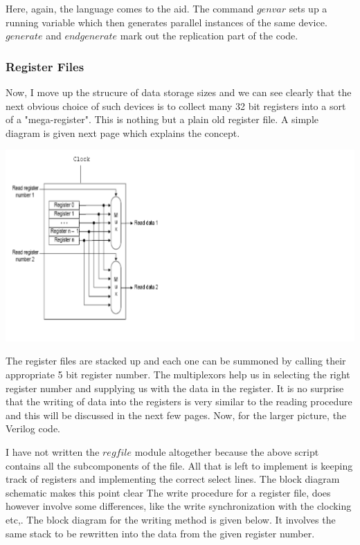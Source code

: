 \documentclass[11pt]{article}
\begin{document}
\begin{description}
Here, again, the language comes to the aid. The command $genvar$ sets up a running variable which then generates parallel instances of the same device. $generate$ and $endgenerate$ mark out the replication part of the code.
\subsubsection{Register Files}
Now, I move up the strucure of data storage sizes and we can see clearly that the next obvious choice of such devices is to collect many 32 bit registers into a sort of a "mega-register". This is nothing but a plain old register file. A simple diagram is given next page which explains the concept. 

\includegraphics[scale=0.7]{regfile.png}

The register files are stacked up and each one can be summoned by calling their appropriate 5 bit register number. The multiplexors help us in selecting the right register number and supplying us with the data in the register. It is no surprise that the writing of data into the registers is very similar to the reading procedure and this will be discussed in the next few pages. Now, for the larger picture, the Verilog code.





I have not written the $regfile$ module altogether because the above script contains all the subcomponents of the file. All that is left to implement is keeping track of registers and implementing the correct select lines. The block diagram schematic makes this point clear
The write procedure for a register file, does however involve some differences, like the write synchronization with the clocking etc,. The block diagram for the writing method is given below. It involves the same stack to be rewritten into the data from the given register number.
 

\end{description}
\end{document}

